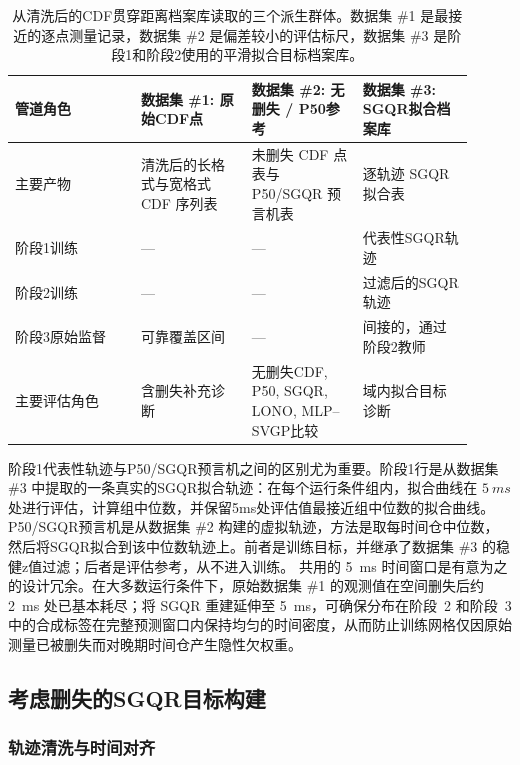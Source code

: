 \begin{table}[t]
\centering
\footnotesize
\setlength{\tabcolsep}{3pt}
\begin{tabular}{@{}L{0.25\linewidth}L{0.22\linewidth}L{0.22\linewidth}L{0.22\linewidth}@{}}
\toprule
管道角色 & 数据集 \#1: 原始CDF点 & 数据集 \#2: 无删失 / P50参考 & 数据集 \#3: SGQR拟合档案库 \\
\midrule
主要产物 & 清洗后的长格式与宽格式 CDF 序列表 & 未删失 CDF 点表与 P50/SGQR 预言机表 & 逐轨迹 SGQR 拟合表 \\
\midrule
阶段1训练 & --- & --- & 代表性SGQR轨迹 \\
阶段2训练 & --- & --- & 过滤后的SGQR轨迹 \\
阶段3原始监督 & 可靠覆盖区间 & --- & 间接的，通过阶段2教师 \\
\midrule
主要评估角色 & 含删失补充诊断 & 无删失CDF, P50, SGQR, LONO, MLP--SVGP比较 & 域内拟合目标诊断 \\
\bottomrule
\end{tabular}
\caption{从清洗后的CDF贯穿距离档案库读取的三个派生群体。数据集 \#1 是最接近的逐点测量记录，数据集 \#2 是偏差较小的评估标尺，数据集 \#3 是阶段1和阶段2使用的平滑拟合目标档案库。}
\label{tab:three-derived-populations}
\end{table}

阶段1代表性轨迹与P50/SGQR预言机之间的区别尤为重要。阶段1行是从数据集 \#3 中提取的一条真实的SGQR拟合轨迹：在每个运行条件组内，拟合曲线在 \(\SI{5}{ms}\) 处进行评估，计算组中位数，并保留5ms处评估值最接近组中位数的拟合曲线。P50/SGQR预言机是从数据集 \#2 构建的虚拟轨迹，方法是取每时间仓中位数，然后将SGQR拟合到该中位数轨迹上。前者是训练目标，并继承了数据集 \#3 的稳健z值过滤；后者是评估参考，从不进入训练。
共用的 \SI{5}{ms} 时间窗口是有意为之的设计冗余。在大多数运行条件下，原始数据集 \#1 的观测值在空间删失后约 \SI{2}{ms} 处已基本耗尽；将 SGQR 重建延伸至 \SI{5}{ms}，可确保分布在阶段~2 和阶段~3 中的合成标签在完整预测窗口内保持均匀的时间密度，从而防止训练网格仅因原始测量已被删失而对晚期时间仓产生隐性欠权重。

\subsection{考虑删失的SGQR目标构建}
\label{sec:SGQR-target-construction-en}

\subsubsection{轨迹清洗与时间对齐}

